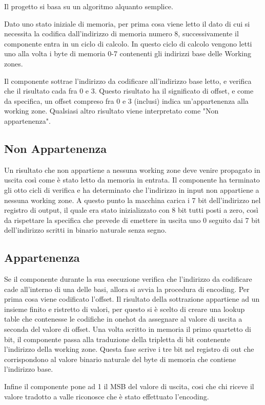 \documentclass{article}
\begin{document}
\begin{flushleft}


Il progetto si basa su un algoritmo alquanto semplice.
\smallskip

Dato uno stato iniziale di memoria, per prima cosa viene letto il dato di cui si necessita la codifica dall'indirizzo di memoria numero 8, successivamente il componente entra in un ciclo di calcolo. In questo ciclo di calcolo vengono letti uno alla volta i byte di memoria 0-7 contenenti gli indirizzi base delle Working zones.
\smallskip

 Il componente sottrae l'indirizzo da codificare all'indirizzo base letto, e verifica che il risultato cada fra 0 e 3. Questo risultato ha il significato di offset, e come da specifica, un offset compreso fra 0 e 3 (inclusi) indica un'appartenenza alla working zone. Qualsiasi altro risultato viene interpretato come "Non appartenenza".

\subsection{Non Appartenenza}\label{notA}

Un risultato che non appartiene a nessuna working zone deve venire propagato in uscita così come è stato letto da memoria in entrata. Il componente ha terminato gli otto cicli di verifica e ha determinato che l'indirizzo in input non appartiene a nessuna working zone. A questo punto la macchina carica i 7 bit dell'indirizzo nel registro di output, il quale era stato inizializzato con 8 bit tutti posti a zero, così da rispettare la specifica che prevede di emettere in uscita uno 0 seguito dai 7 bit dell'indirizzo scritti in binario naturale senza segno.

\newpage

\subsection{Appartenenza}\label{app}

Se il componente durante la sua esecuzione verifica che l'indirizzo da codificare cade all'interno di una delle basi, allora si avvia la procedura di encoding. Per prima cosa viene codificato l'offset. Il risultato della sottrazione appartiene ad un insieme finito e ristretto di valori, per questo si è scelto di creare una lookup table che contenesse le codifiche in onehot da assegnare al valore di uscita a seconda del valore di offset.
Una volta scritto in memoria il primo quartetto di bit, il componente passa alla traduzione della tripletta di bit contenente l'indirizzo della working zone. Questa fase scrive i tre bit nel registro di out che corrispondono al valore binario naturale del byte di memoria che contiene l'indirizzo base.

Infine il componente pone ad 1 il MSB del valore di uscita, cosi che chi riceve il valore tradotto a valle riconosce che è stato effettuato l'encoding.


\end{flushleft}
\end{document}
